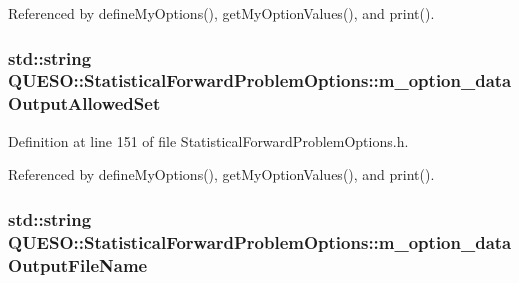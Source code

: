 Referenced by define\-My\-Options(), get\-My\-Option\-Values(), and print().

\hypertarget{class_q_u_e_s_o_1_1_statistical_forward_problem_options_a8f7d13eaec063727f412add0a1a4d9af}{
\subsubsection[{m\-\_\-option\-\_\-data\-Output\-Allowed\-Set}]{\setlength{\rightskip}{0pt plus 5cm}std\-::string Q\-U\-E\-S\-O\-::\-Statistical\-Forward\-Problem\-Options\-::m\-\_\-option\-\_\-data\-Output\-Allowed\-Set\hspace{0.3cm}{\ttfamily [private]}}}\label{class_q_u_e_s_o_1_1_statistical_forward_problem_options_a8f7d13eaec063727f412add0a1a4d9af}


Definition at line 151 of file Statistical\-Forward\-Problem\-Options.\-h.



Referenced by define\-My\-Options(), get\-My\-Option\-Values(), and print().

\hypertarget{class_q_u_e_s_o_1_1_statistical_forward_problem_options_ad4f884177efb0d4ab7068dfe00861f9c}{
\subsubsection[{m\-\_\-option\-\_\-data\-Output\-File\-Name}]{\setlength{\rightskip}{0pt plus 5cm}std\-::string Q\-U\-E\-S\-O\-::\-Statistical\-Forward\-Problem\-Options\-::m\-\_\-option\-\_\-data\-Output\-File\-Name\hspace{0.3cm}{\ttfamily [private]}}}\label{class_q_u_e_s_o_1_1_statistical_forward_problem_options_ad4f884177efb0d4ab7068dfe00861f9c}


